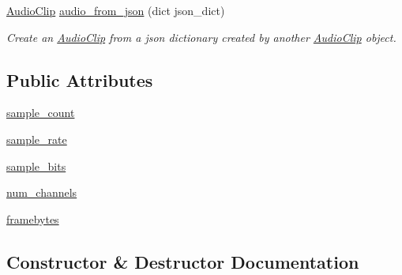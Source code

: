 \begin{DoxyCompactItemize}
 \textquotesingle{}\mbox{\hyperlink{classbridges_1_1audio__clip_1_1_audio_clip}{Audio\+Clip}}\textquotesingle{} \mbox{\hyperlink{classbridges_1_1audio__clip_1_1_audio_clip_a573832e46c882be0d3be0be63c272e2c}{audio\+\_\+from\+\_\+json}} (dict json\+\_\+dict)
\begin{DoxyCompactList}\small\item\em Create an \mbox{\hyperlink{classbridges_1_1audio__clip_1_1_audio_clip}{Audio\+Clip}} from a json dictionary created by another \mbox{\hyperlink{classbridges_1_1audio__clip_1_1_audio_clip}{Audio\+Clip}} object. \end{DoxyCompactList}\end{DoxyCompactItemize}
\subsection*{Public Attributes}
\begin{DoxyCompactItemize}
\item 
\mbox{\hyperlink{classbridges_1_1audio__clip_1_1_audio_clip_ac9551b041b0d6b7e7b2a1db623c56159}{sample\+\_\+count}}
\item 
\mbox{\hyperlink{classbridges_1_1audio__clip_1_1_audio_clip_a265e017578bdd94664f308f51b596c6d}{sample\+\_\+rate}}
\item 
\mbox{\hyperlink{classbridges_1_1audio__clip_1_1_audio_clip_a274e7ae8cd17a96d068265795b9c0718}{sample\+\_\+bits}}
\item 
\mbox{\hyperlink{classbridges_1_1audio__clip_1_1_audio_clip_ace413dc6646f965e2d0f75e1d84000c9}{num\+\_\+channels}}
\item 
\mbox{\hyperlink{classbridges_1_1audio__clip_1_1_audio_clip_a8af93e6689978881cc60e7cdf4092ce7}{framebytes}}
\end{DoxyCompactItemize}


\subsection{Constructor \& Destructor Documentation}
\mbox{\label{classbridges_1_1audio__clip_1_1_audio_clip_a5848ac088c4d49a211d39be7e5d116e3}} 
